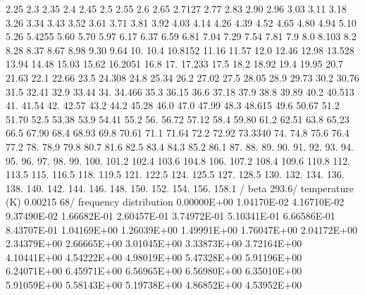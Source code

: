 \begin{ccode}
    2.25        2.3       2.35      2.4       2.45      2.5       2.55
    2.6         2.65     2.7127     2.77      2.83      2.90      2.96
    3.03        3.11      3.18      3.26      3.34      3.43      3.52
    3.61        3.71      3.81      3.92      4.03      4.14      4.26
    4.39        4.52      4.65      4.80      4.94      5.10      5.26
    5.4255      5.60      5.70      5.97      6.17      6.37      6.59
    6.81        7.04      7.29    7.54  7.81  7.9  8.0  8.103  8.2 8.28  8.37
    8.67        8.98      9.30      9.64     10.      10.4       10.8152
   11.16       11.57     12.0      12.46     12.98    13.528     13.94
   14.48       15.03     15.62     16.2051   16.8 17.  17.233  17.5  18.2
   18.92       19.4      19.95     20.7     21.63     22.1       22.66
   23.5        24.308    24.8      25.34    26.2      27.02      27.5
   28.05       28.9      29.73     30.2     30.76     31.5       32.41
   32.9        33.44     34.       34.466    35.3     36.15      36.6
   37.18       37.9      38.8      39.89     40.2     40.513     41.
   41.54       42.       42.57     43.2      44.2     45.28      46.0
   47.0        47.99     48.3      48.615    49.6     50.67      51.2
   51.70       52.5      53.38     53.9      54.41    55.2       56.
   56.72       57.12     58.4      59.80     61.2     62.51      63.8
   65.23       66.5      67.90     68.4      68.93    69.8       70.61
   71.1        71.64     72.2      72.92     73.3340  74.        74.8
   75.6        76.4      77.2      78.       78.9     79.8       80.7
   81.6        82.5      83.4      84.3      85.2     86.1       87.
   88.         89.       90.       91.       92.      93.        94.
   95.         96.       97.       98.       99.     100.       101.2
  102.4       103.6     104.8     106.      107.2    108.4      109.6
  110.8       112.      113.5     115.      116.5    118.       119.5
  121.        122.5     124.      125.5     127.     128.5      130.
  132.        134.      136.      138.      140.     142.       144.
  146.        148.      150.      152.      154.     156.       158.1 /  beta
 293.6/  temperature (K)
 0.00215 68/  frequency distribution
  0.00000E+00  1.04170E-02  4.16710E-02  9.37490E-02  1.66682E-01
  2.60457E-01  3.74972E-01  5.10341E-01  6.66586E-01  8.43707E-01
  1.04169E+00  1.26039E+00  1.49991E+00  1.76047E+00  2.04172E+00
  2.34379E+00  2.66665E+00  3.01045E+00  3.33873E+00  3.72164E+00
  4.10441E+00  4.54222E+00  4.98019E+00  5.47328E+00  5.91196E+00
  6.24071E+00  6.45971E+00  6.56965E+00  6.56980E+00  6.35010E+00
  5.91059E+00  5.58143E+00  5.19738E+00  4.86852E+00  4.53952E+00

\end{ccode}
